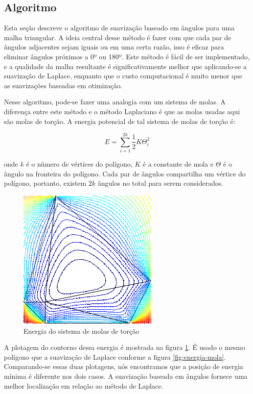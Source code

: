 \subsection{Algoritmo}
Esta seção descreve o algoritmo de suavização baseado em ângulos para uma malha triangular. A ideia central desse método é fazer com que cada par de ângulos adjacentes sejam iguais ou em uma certa razão, isso é eficaz para eliminar ângulos próximos a 0º ou 180º. Este método é fácil de ser implementado, e a qualidade da malha resultante é significativamente melhor que aplicando-se a suavização de Laplace, enquanto que o custo computacional é muito menor que as suavizações baseadas em otimização.

Nesse algoritmo, pode-se fazer uma analogia com um sistema de molas. A diferença entre este método e o método Laplaciano é que as molas usadas aqui são molas de torção. A energia potencial de tal sistema de molas de torção é:

\begin{equation*}
    E = \sum_{i=1}^{2k} \frac{1}{2} K \Theta_i^2
\end{equation*}

onde $k$ é o número de vértices do polígono, $K$ é a constante de mola e $\Theta$ é o ângulo na fronteira do polígono. Cada par de ângulos compartilha um vértice do polígono, portanto, existem $2k$ ângulos no total para serem considerados.

\begin{figure}[h]
    \centering
    \includegraphics{fig/contorno-mola-torcao.png}
    \caption{Energia do sistema de molas de torção}
    \label{fig:contorno-mola-torcao}
\end{figure}

A plotagem do contorno dessa energia é mostrada na figura \ref{fig:contorno-mola-torcao}. É usado o mesmo polígono que a suavização de Laplace conforme a figura \ref{fig:energia-mola}. Comparando-se essas duas plotagens, nós encontramos que a posição de energia mínima é diferente nos dois casos. A suavização baseada em ângulos fornece uma melhor localização em relação ao método de Laplace.

